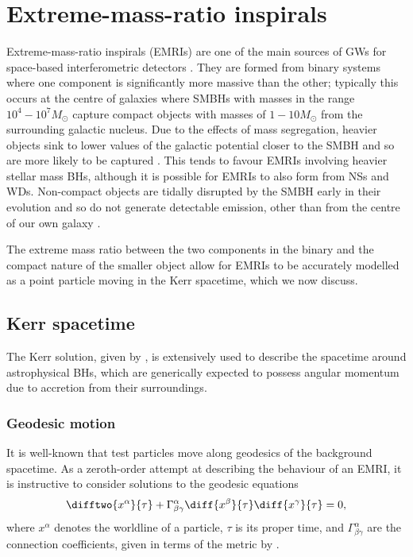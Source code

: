 \chapter[Extreme-mass-ratio inspirals (EMRIs)]{Extreme-mass-ratio inspirals}\label{ch:EMRIs}

Extreme-mass-ratio inspirals (EMRIs) are one of the main sources of GWs for space-based interferometric detectors \citep{amaro-seoane_intermediate_2007}. They are formed from binary systems where one component is significantly more massive than the other; typically this occurs at the centre of galaxies where SMBHs with masses in the range $10^4 - 10^7 M_\odot$ capture compact objects with masses of $1-10 M_\odot$ from the surrounding galactic nucleus. Due to the effects of mass segregation, heavier objects sink to lower values of the galactic potential closer to the SMBH and so are more likely to be captured \citep{freitag_stellar_2006}. This tends to favour EMRIs involving heavier stellar mass BHs, although it is possible for EMRIs to also form from NSs and WDs. Non-compact objects are tidally disrupted by the SMBH early in their evolution and so do not generate detectable emission, other than from the centre of our own galaxy \citep{freitag_gravitational_2003}.

The extreme mass ratio between the two components in the binary and the compact nature of the smaller object allow for EMRIs to be accurately modelled as a point particle moving in the Kerr spacetime, which we now discuss.

\section{Kerr spacetime}
The Kerr solution, given by , is extensively used to describe the spacetime around astrophysical BHs, which are generically expected to possess angular momentum due to accretion from their surroundings.

\subsection{Geodesic motion}
\label{sec:kerr-geodesic}
It is well-known that test particles move along geodesics of the background spacetime. As a zeroth-order attempt at describing the behaviour of an EMRI, it is instructive to consider solutions to the geodesic equations
\begin{equation}
\label{eq:geodesic-equation}
\difftwo{x^\alpha}{\tau} + \Gamma^\alpha_{\beta\gamma}\diff{x^\beta}{\tau}\diff{x^\gamma}{\tau} = 0,
\end{equation}
where $x^\alpha$ denotes the worldline of a particle, $\tau$ is its proper time, and $\Gamma^\alpha_{\beta\gamma}$ are the connection coefficients, given in terms of the metric by .

